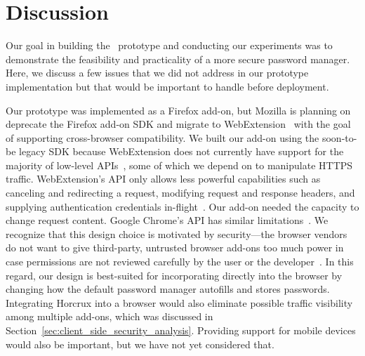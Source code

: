 \section{Discussion} \label{sec:discussion}




Our goal in building the \SecPass\ prototype and conducting our experiments was to demonstrate the feasibility and practicality of a more secure password manager. Here, we discuss a few issues that we did not address in our prototype implementation but that would be important to handle before deployment.

 \label{deprecated}
Our prototype was implemented as a Firefox add-on, but Mozilla is planning on deprecate the Firefox add-on SDK and migrate to WebExtension~\cite{webextension} with the goal of supporting cross-browser compatibility. We built our add-on using the soon-to-be legacy SDK because WebExtension does not currently have support for the majority of low-level APIs~\cite{FirefoxComparisonSDKWebExtension}, some of which we depend on to manipulate HTTPS traffic. WebExtension's  API only allows less powerful capabilities such as canceling and redirecting a request, modifying request and response headers, and supplying authentication credentials in-flight~\cite{firefox_webrequest}. Our add-on needed the capacity to change  request content. Google Chrome's  API has similar limitations~\cite{chrome_webrequest}. We recognize that this design choice is motivated by security---the browser vendors do not want to give third-party, untrusted browser add-ons too much power in case permissions are not reviewed carefully by the user or the developer~\cite{barth2010protecting}. In this regard, our design is best-suited for incorporating directly into the browser by changing how the default password manager autofills and stores passwords. Integrating Horcrux into a browser would also eliminate possible traffic visibility among multiple add-ons, which was discussed in Section~\ref{sec:client_side_security_analysis}. Providing support for mobile devices would also be important, but we have not yet considered that.

